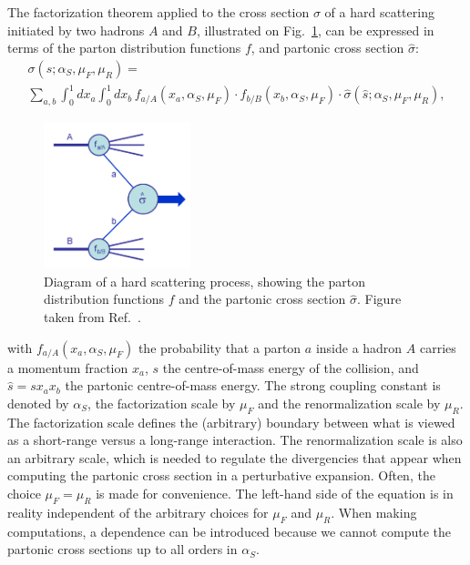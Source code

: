 The factorization theorem applied to the cross section $\sigma$ of a hard scattering initiated by
two hadrons $A$ and $B$, illustrated on Fig.~\ref{fig:event_hard_scatter},
can be expressed in terms of the parton distribution functions $f$, and partonic cross section
$\hat{\sigma}$:
\begin{multline}
  \sigma(s;\alpha_S,\mu_F,\mu_R) = \\ 
  \sum_{a,b} \int_0^1 dx_a \int_0^1 dx_b \,  f_{a/A}(x_a, \alpha_S, \mu_F) \cdot f_{b/B}(x_b,
\alpha_S, \mu_F) \cdot \hat{\sigma}(\hat{s};\alpha_S,\mu_F,\mu_R),
\label{eq:factorization_theorem} 
\end{multline}
 \begin{figure}
  \centering
  \vspace{-1eM}
  \includegraphics[width=0.38\textwidth]{figures/eventreco_event/Hardscattering}
  \caption{Diagram of a hard scattering process, showing the parton distribution functions
$f$ and the partonic cross section $\hat{\sigma}$. Figure taken from Ref.~\cite{Campbell:2006wx}.
  \label{fig:event_hard_scatter}}
\end{figure}
with $f_{a/A}(x_a, \alpha_S, \mu_F)$ the probability that a parton $a$ inside
a hadron $A$ carries a momentum fraction $x_a$, $s$ the centre-of-mass energy of the collision,
and $\hat{s} = s x_a x_b$ the partonic centre-of-mass energy.
The strong coupling constant is denoted by $\alpha_S$, the factorization scale by $\mu_F$ and the
 renormalization scale by $\mu_R$.
The factorization scale defines the (arbitrary) boundary between what is viewed as a short-range
versus a long-range interaction. The renormalization scale is also an arbitrary scale, which is
needed to regulate the divergencies that appear when computing the partonic cross section in a
perturbative expansion. 
Often, the choice $\mu_F = \mu_R$ is made for convenience.
The left-hand side of the equation is in reality independent of the arbitrary choices for $\mu_F$
and $\mu_R$. When making computations, a dependence can be introduced because we cannot
compute the partonic cross sections up to all orders in $\alpha_S$. 


